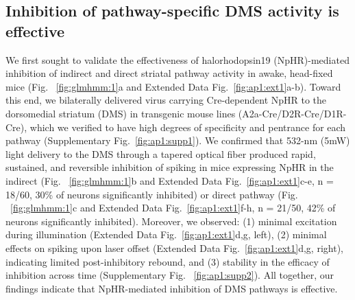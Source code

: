\subsection{Inhibition of pathway-specific DMS activity is effective}
\label{sec:glmhmm:2.2.1}
We first sought to validate the effectiveness of halorhodopsin19 (NpHR)-mediated inhibition of indirect and direct striatal pathway activity in awake, head-fixed mice (Fig. ~\ref{fig:glmhmm:1}a and Extended Data Fig.~\ref{fig:ap1:ext1}a-b). Toward this end, we bilaterally delivered virus carrying Cre-dependent NpHR to the dorsomedial striatum (DMS) in transgenic mouse lines (A2a-Cre/D2R-Cre/D1R-Cre), which we verified to have high degrees of specificity and pentrance for each pathway (Supplementary Fig.~\ref{fig:ap1:supp1}). We confirmed that 532-nm (5mW) light delivery to the DMS through a tapered optical fiber produced rapid, sustained, and reversible inhibition of spiking in mice expressing NpHR in the indirect (Fig. ~\ref{fig:glmhmm:1}b and Extended Data Fig.~\ref{fig:ap1:ext1}c-e, n = 18/60, 30\% of neurons significantly inhibited) or direct pathway (Fig. ~\ref{fig:glmhmm:1}c and Extended Data Fig.~\ref{fig:ap1:ext1}f-h, n = 21/50, 42\% of neurons significantly inhibited). Moreover, we observed: (1) minimal excitation during illumination \cite{owen_thermal_2019,cruz_striatal_2020} (Extended Data Fig.~\ref{fig:ap1:ext1}d,g, left), (2) minimal effects on spiking upon laser offset (Extended Data Fig.~\ref{fig:ap1:ext1}d,g, right), indicating limited post-inhibitory rebound, and (3) stability in the efficacy of inhibition across time (Supplementary Fig. ~\ref{fig:ap1:supp2}). All together, our findings indicate that NpHR-mediated inhibition of DMS pathways is effective. 


